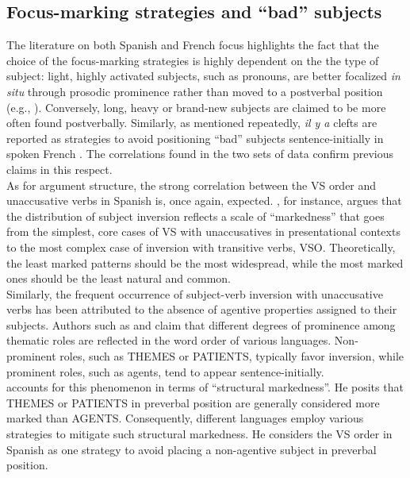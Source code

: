 \subsection{Focus-marking strategies and ``bad” subjects}
The literature on both Spanish and French focus highlights the fact that the choice of the focus-marking strategies is highly dependent on the the type of subject: light, highly activated subjects, such as pronouns, are better focalized \textit{in situ} through prosodic prominence rather than moved to a postverbal position (e.g., \cite{gabriel2007fokus}). Conversely, long, heavy or brand-new subjects are claimed to be more often found postverbally. Similarly, as mentioned repeatedly, \textit{il y a} clefts are reported as strategies to avoid positioning ``bad” subjects sentence-initially in spoken French \parencite{lambrecht2010constraints, karssenberg20186}. The correlations found in the two sets of data confirm previous claims in this respect.\\
As for argument structure, the strong correlation between the VS order and unaccusative verbs in Spanish is, once again, expected. \textcite{leonetti201724}, for instance, argues that  the distribution of subject inversion reflects a scale of “markedness” that goes from the simplest, core cases of VS with unaccusatives in presentational contexts to the most complex case of inversion with transitive verbs, VSO. Theoretically, the least marked patterns should be the most widespread, while the most marked ones should be the least natural and common.\\
Similarly, the frequent occurrence of subject-verb inversion with unaccusative verbs has been attributed to the absence of agentive properties assigned to their subjects. Authors such as \textcite{contreras1978orden} and \textcite{gutierrez2013structural} claim that different degrees of prominence among thematic roles are reflected in the word order of various languages. Non-prominent roles, such as {\selectfont THEMES} or {\selectfont PATIENTS}, typically favor inversion, while prominent roles, such as agents, tend to appear sentence-initially.\\
\textcite{gutierrez2013structural} accounts for this phenomenon in terms of ``structural markedness”. He posits that {\selectfont THEMES} or {\selectfont PATIENTS} in preverbal position are generally considered more marked than {\selectfont AGENTS}. Consequently, different languages employ various strategies to mitigate such structural markedness. He considers the VS order in Spanish as one strategy to avoid placing a non-agentive subject in preverbal position.\\
